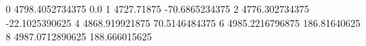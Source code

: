 0 4798.4052734375 0.0
1 4727.71875 -70.6865234375
2 4776.302734375 -22.1025390625
4 4868.919921875 70.5146484375
6 4985.2216796875 186.81640625
8 4987.0712890625 188.666015625
